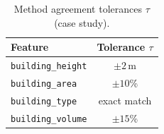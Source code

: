 \begin{table}[t]
  \centering
  \caption{Method agreement tolerances $\tau$ (case study).}
  \label{tab:tolerances}
  \small
  \begin{tabular}{lc}
    \toprule
    Feature & Tolerance $\tau$ \\
    \midrule
    \texttt{building\_height} & $\pm 2$\,m \\
    \texttt{building\_area} & $\pm 10$\% \\
    \texttt{building\_type} & exact match \\
    \texttt{building\_volume} & $\pm 15$\% \\
    \bottomrule
  \end{tabular}
\end{table}
